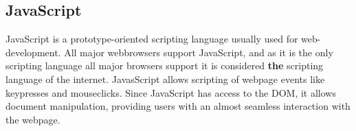 \subsection{JavaScript}
JavaScript is a prototype-oriented scripting language usually used for
web-development. All major webbrowsers support JavaScript, and as it is the only
scripting language all major browsers support it is considered \textbf{the}
scripting language of the internet. 
JavasScript allows scripting of webpage events like keypresses and mouseclicks.
Since JavaScript has access to the DOM, it allows document manipulation,
providing users with an almost seamless interaction with the webpage.

